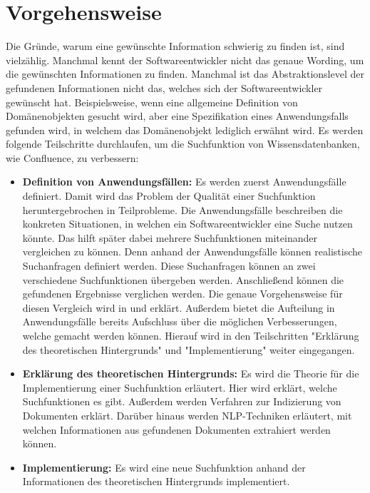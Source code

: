 \section{Vorgehensweise}
Die Gründe, warum eine gewünschte Information schwierig zu finden ist, sind vielzählig.
Manchmal kennt der Softwareentwickler nicht das genaue Wording, um die gewünschten Informationen zu finden.
Manchmal ist das Abstraktionslevel der gefundenen Informationen nicht das, welches sich der Softwareentwickler gewünscht hat.
Beispielsweise, wenn eine allgemeine Definition von Domänenobjekten gesucht wird, aber eine Spezifikation eines Anwendungsfalls gefunden wird, in welchem das Domänenobjekt lediglich erwähnt wird.
Es werden folgende Teilschritte durchlaufen, um die Suchfunktion von Wissensdatenbanken, wie Confluence, zu verbessern:
\begin{itemize}
   \item \textbf{Definition von Anwendungsfällen:}
         Es werden zuerst Anwendungsfälle definiert.
         Damit wird das Problem der Qualität einer Suchfunktion heruntergebrochen in Teilprobleme.
         Die Anwendungsfälle beschreiben die konkreten Situationen, in welchen ein Softwareentwickler eine Suche nutzen könnte.
         Das hilft später dabei mehrere Suchfunktionen miteinander vergleichen zu können.
         Denn anhand der Anwendungsfälle können realistische Suchanfragen definiert werden.
         Diese Suchanfragen können an zwei verschiedene Suchfunktionen übergeben werden.
         Anschließend können die gefundenen Ergebnisse verglichen werden.
         Die genaue Vorgehensweise für diesen Vergleich wird in  und  erklärt.
         Außerdem bietet die Aufteilung in Anwendungsfälle bereits Aufschluss über die möglichen Verbesserungen, welche gemacht werden können.
         Hierauf wird in den Teilschritten "Erklärung des theoretischen Hintergrunds" und "Implementierung" weiter eingegangen.
   \item \textbf{Erklärung des theoretischen Hintergrunds:}
         Es wird die Theorie für die Implementierung einer Suchfunktion erläutert.
         Hier wird erklärt, welche Suchfunktionen es gibt.
         Außerdem werden Verfahren zur Indizierung von Dokumenten erklärt.
         Darüber hinaus werden NLP-Techniken erläutert, mit welchen Informationen aus gefundenen Dokumenten extrahiert werden können.
   \item \textbf{Implementierung:}
         Es wird eine neue Suchfunktion anhand der Informationen des theoretischen Hintergrunds implementiert.

\end{itemize}
